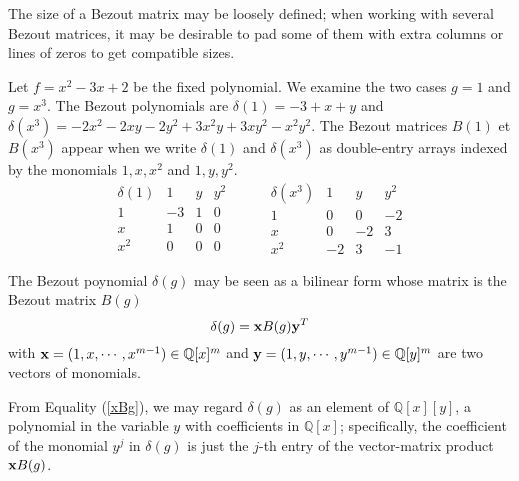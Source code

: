 \documentclass{standalone}
\begin{document}
\begin{rem}
The size of a Bezout matrix may be loosely defined; when working with several Bezout matrices, it may be desirable to pad some of them with extra columns or lines of zeros to get compatible sizes.
\end{rem}

\begin{exmp}
\label{exmp_1}
Let $f = x^2 - 3x + 2$ be the fixed polynomial. We examine the two cases $g=1$ and $g = x^3$. The Bezout polynomials are $\delta(1) = -3 + x + y$ and $\delta(x^3) = -2x^2 - 2xy -2y^2 + 3x^2y + 3xy^2 -x^2y^2$. The Bezout matrices $B(1)$ et $B(x^3)$ appear when we write  $\delta(1)$ and  $\delta(x^3)$ as double-entry arrays indexed by the monomials $1, x, x^2$ and $1, y, y^2$.
$$
\begin{array}{c|ccc}
\delta(1) & 1 & y & y^2\\
\hline
1 & -3 & 1 & 0\\
x & 1 & 0 & 0\\
x^2 & 0 & 0 & 0
\end{array}
\hspace{1cm}
\begin{array}{c|ccc}
\delta(x^3) & 1 & y & y^2\\
\hline
1 & 0 & 0 & -2\\
x & 0 & -2 & 3\\
x^2 & -2 & 3 & -1
\end{array}
$$
\end{exmp}
\begin{rem}
The Bezout poynomial $\delta(g)$ may be seen as a bilinear form whose matrix is the Bezout matrix $B(g)$
\begin{equation}
	\label{xBg}
	\delta(g) = \bold{x} B(g) \bold{y}^T
\end{equation}
with $\bold{x} = (1, x,\cdots, x^{m-1}) \in \mathbb{Q}[x]^m$ and $\bold{y} = (1, y,\cdots, y^{m-1}) \in \mathbb{Q}[y]^m$ are two vectors of monomials.
\end{rem}
From Equality (\ref{xBg}), we may regard $\delta(g)$ as an element of $\mathbb{Q}[x][y]$, a polynomial in the variable $y$ with coefficients in $\mathbb{Q}[x]$; specifically, the coefficient of the monomial $y^j$ in $\delta(g)$ is just the $j$-th entry of the vector-matrix product $\bold{x} B(g)$.
\end{document}

